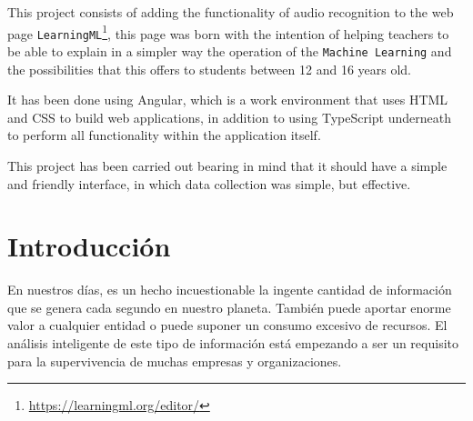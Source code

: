 \documentclass[a4paper, 12pt]{book}
\begin{document}
This project consists of adding the functionality of audio recognition to the web page \texttt{LearningML}\footnote{\url{https://learningml.org/editor/}}, this page was born with the intention of helping teachers to be able to explain in a simpler way the operation of the \texttt{Machine Learning} and the possibilities that this offers to students between 12 and 16 years old.

It has been done using Angular, which is a work environment that uses HTML and CSS to build web applications, in addition to using TypeScript underneath to perform all functionality within the application itself.

This project has been carried out bearing in mind that it should have a simple and friendly interface, in which data collection was simple, but effective.




\tableofcontents 
\cleardoublepage
\listoffigures %



\cleardoublepage
\chapter{Introducción}
\label{chap:intro} %

En nuestros días, es un hecho incuestionable la ingente cantidad de información que se genera cada segundo en nuestro planeta. También puede aportar enorme valor a cualquier entidad o puede suponer un consumo excesivo de recursos. El análisis inteligente de este tipo de información está empezando a ser un requisito para la supervivencia de muchas empresas y organizaciones.\cite{mate2014big}
\end{document}
